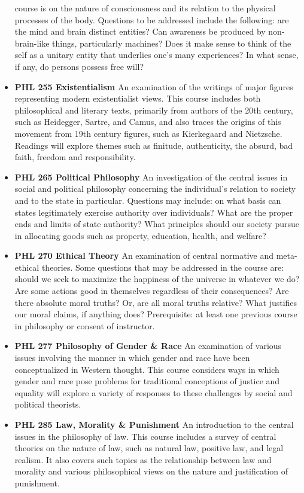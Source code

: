 \documentclass[
  letterpaper,
]{scrbook}
\begin{document}
\begin{itemize}
  course is on the nature of consciousness and its relation to the
  physical processes of the body. Questions to be addressed include the
  following: are the mind and brain distinct entities? Can awareness be
  produced by non-brain-like things, particularly machines? Does it make
  sense to think of the self as a unitary entity that underlies one's
  many experiences? In what sense, if any, do persons possess free will?
\item
  \textbf{PHL 255 Existentialism} An examination of the writings of
  major figures representing modern existentialist views. This course
  includes both philosophical and literary texts, primarily from authors
  of the 20th century, such as Heidegger, Sartre, and Camus, and also
  traces the origins of this movement from 19th century figures, such as
  Kierkegaard and Nietzsche. Readings will explore themes such as
  finitude, authenticity, the absurd, bad faith, freedom and
  responsibility.
\item
  \textbf{PHL 265 Political Philosophy} An investigation of the central
  issues in social and political philosophy concerning the individual's
  relation to society and to the state in particular. Questions may
  include: on what basis can states legitimately exercise authority over
  individuals? What are the proper ends and limits of state authority?
  What principles should our society pursue in allocating goods such as
  property, education, health, and welfare?
\item
  \textbf{PHL 270 Ethical Theory} An examination of central normative
  and meta-ethical theories. Some questions that may be addressed in the
  course are: should we seek to maximize the happiness of the universe
  in whatever we do? Are some actions good in themselves regardless of
  their consequences? Are there absolute moral truths? Or, are all moral
  truths relative? What justifies our moral claims, if anything does?
  Prerequisite: at least one previous course in philosophy or consent of
  instructor.
\item
  \textbf{PHL 277 Philosophy of Gender \& Race} An examination of
  various issues involving the manner in which gender and race have been
  conceptualized in Western thought. This course considers ways in which
  gender and race pose problems for traditional conceptions of justice
  and equality will explore a variety of responses to these challenges
  by social and political theorists.
\item
  \textbf{PHL 285 Law, Morality \& Punishment} An introduction to the
  central issues in the philosophy of law. This course includes a survey
  of central theories on the nature of law, such as natural law,
  positive law, and legal realism. It also covers such topics as the
  relationship between law and morality and various philosophical views
  on the nature and justification of punishment.
\end{itemize}
\end{document}
